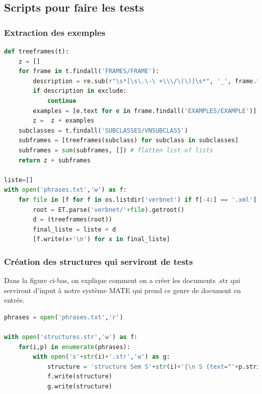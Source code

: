 \subsection{Scripts pour faire les tests}

\subsubsection{Extraction des exemples}

\begin{lstlisting}[language=Python, caption = code pour créer phrases.txt]
def treeframes(t):
    z = []
    for frame in t.findall('FRAMES/FRAME'):
        description = re.sub(r"\s*[\s\.\-\ +\\\/\(\)]\s*", '_', frame.find('DESCRIPTION').get('primary'))
        if description in exclude:
            continue    
        examples = [e.text for e in frame.findall('EXAMPLES/EXAMPLE')]
        z =  z + examples 
    subclasses = t.findall('SUBCLASSES/VNSUBCLASS')
    subframes = [treeframes(subclass) for subclass in subclasses]
    subframes = sum(subframes, []) # flatten list of lists
    return z + subframes

liste=[]
with open('phrases.txt','w') as f:
    for file in [f for f in os.listdir('verbnet') if f[-4:] == '.xml']:
        root = ET.parse('verbnet/'+file).getroot()       
        d = (treeframes(root))
        final_liste = liste + d
        [f.write(x+'\n') for x in final_liste]

\end{lstlisting}

\subsubsection{Création des structures qui serviront de tests}

Dans la figure ci-bas, on explique comment on a créer les documents .str qui serviront d'input à notre système MATE qui prend ce genre de document en entrée.

\begin{lstlisting}[language=Python, caption = code pour créer des structures .str]
phrases = open('phrases.txt','r')

with open('structures.str','w') as f:
    for(i,p) in enumerate(phrases):
        with open('s'+str(i)+'.str','w') as g:
            structure = 'structure Sem S'+str(i)+'{\n S {text="'+p.strip()+'"\n\n main-> \n }\n}'
            f.write(structure)
            g.write(structure)
\end{lstlisting}
